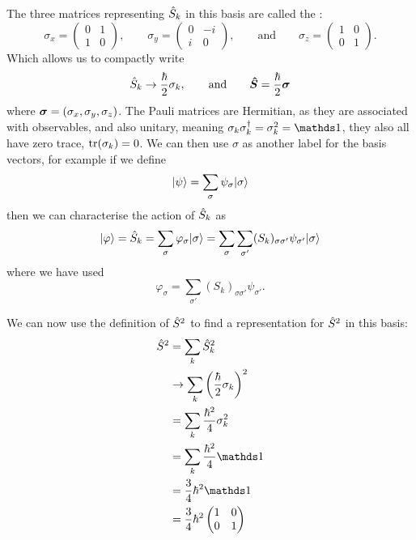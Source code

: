 The three matrices representing \(\hat{S}_k\) in this basis are called the :
\[
\sigma_x =
\begin{pmatrix}
    0 & 1\\
    1 & 0
\end{pmatrix}
,\qquad \sigma_y =
\begin{pmatrix}
    0 & -i\\
    i & 0
\end{pmatrix}
,\qquad\text{and}\qquad \sigma_z = 
\begin{pmatrix}
    1 & 0\\
    0 & 1
\end{pmatrix}
.
\]
Which allows us to compactly write
\[\hat{S}_k \mathrel{\rightarrow} \frac{\hbar}{2}\sigma_k, \qquad\text{and}\qquad \bm{\hat{S}} = \frac{\hbar}{2}\bm{\sigma}\]
where \(\bm{\sigma} = (\sigma_x, \sigma_y, \sigma_z)\).
The Pauli matrices are Hermitian, as they are associated with observables, and also unitary, meaning \(\sigma_k\sigma_k\hermit = \sigma_k^2 = \ident\), they also all have zero trace, \(\tr(\sigma_k) = 0\).
We can then use \(\sigma\) as another label for the basis vectors, for example if we define
\[\vert {\psi} \rangle = \sum_{\sigma} \psi_\sigma\vert {\sigma} \rangle\]
then we can characterise the action of \(\hat{S}_k\) as
\[\vert {\varphi} \rangle = \hat{S}_k = \sum_\sigma \varphi_\sigma\vert {\sigma} \rangle = \sum_\sigma\sum_{\sigma'}(S_k)_{\sigma\sigma'}\psi_{\sigma'}\vert {\sigma} \rangle\]
where we have used
\[\varphi_\sigma = \sum_{\sigma'}(S_k)_{\sigma\sigma'}\psi_{\sigma'}.\]

We can now use the definition of \(\hat{S}^2\) to find a representation for \(\hat{S}^2\) in this basis:
\begin{align*}
    \operator{S}^2 &= \sum_k \operator{S}_k^2\\
    &\representation \sum_k \left(\frac{\hbar}{2}\sigma_k\right)^2\\
    &= \sum_k \frac{\hbar^2}{4}\sigma_k^2\\
    &= \sum_k \frac{\hbar^2}{4}\ident\\
    &= \frac{3}{4}\hbar^2\ident\\
    &= \frac{3}{4}\hbar^2
    \begin{pmatrix}
        1 & 0\\
        0 & 1
    \end{pmatrix}
\end{align*}

